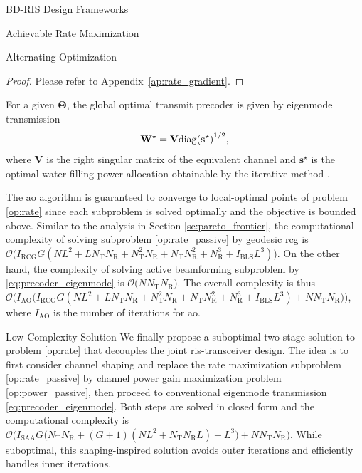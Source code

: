 \begin{section}{BD-RIS Design Frameworks}
\begin{subsection}{Achievable Rate Maximization}
\begin{subsubsection}{Alternating Optimization}
\begin{proof}
	Please refer to Appendix~\ref{ap:rate_gradient}.
\end{proof}
For a given $\mathbf{\Theta}$, the global optimal transmit precoder is given by eigenmode transmission \cite{Clerckx2013}
\begin{equation}
	\mathbf{W}^\star = \mathbf{V} {\operatorname{diag}(\mathbf{s}^\star)}^{1/2},
	\label{eq:precoder_eigenmode}
\end{equation}
where $\mathbf{V}$ is the right singular matrix of the equivalent channel and $\mathbf{s}^\star$ is the optimal water-filling power allocation obtainable by the iterative method \cite{Tse2005}.

The \gls{ao} algorithm is guaranteed to converge to local-optimal points of problem \eqref{op:rate} since each subproblem is solved optimally and the objective is bounded above.
Similar to the analysis in Section \ref{sc:pareto_frontier}, the computational complexity of solving subproblem \eqref{op:rate_passive} by geodesic \gls{rcg} is $\mathcal{O}\bigl(I_\text{RCG} G (NL^2 + L N_\mathrm{T} N_\mathrm{R} + N_\mathrm{T}^2 N_\mathrm{R} + N_\mathrm{T} N_\mathrm{R}^2 + N_\mathrm{R}^3 + I_\text{BLS} L^3)\bigr)$.
On the other hand, the complexity of solving active beamforming subproblem by \eqref{eq:precoder_eigenmode} is $\mathcal{O}\bigl(N N_\mathrm{T} N_\mathrm{R}\bigr)$.
The overall complexity is thus $\mathcal{O}\bigl(I_\text{AO}\bigl(I_\text{RCG} G (NL^2 + L N_\mathrm{T} N_\mathrm{R} + N_\mathrm{T}^2 N_\mathrm{R} + N_\mathrm{T} N_\mathrm{R}^2 + N_\mathrm{R}^3 + I_\text{BLS} L^3) + N N_\mathrm{T} N_\mathrm{R}\bigr)\bigr)$, where $I_\text{AO}$ is the number of iterations for \gls{ao}.
\end{subsubsection}

\begin{subsubsection}{Low-Complexity Solution}\label{sc:low_complexity}
	We finally propose a suboptimal two-stage solution to problem \eqref{op:rate} that decouples the joint \gls{ris}-transceiver design.
	The idea is to first consider channel shaping and replace the rate maximization subproblem \eqref{op:rate_passive} by channel power gain maximization problem \eqref{op:power_passive}, then proceed to conventional eigenmode transmission \eqref{eq:precoder_eigenmode}.
	Both steps are solved in closed form and the computational complexity is $\mathcal{O}\bigl(I_\text{SAA} G \bigl(N_\mathrm{T} N_\mathrm{R} + (G+1)(NL^2+N_\mathrm{T} N_\mathrm{R} L) + L^3\bigr) + N N_\mathrm{T} N_\mathrm{R}\bigr)$.
	While suboptimal, this shaping-inspired solution avoids outer iterations and efficiently handles inner iterations.
\end{subsubsection}
\end{subsection}
\end{section}



